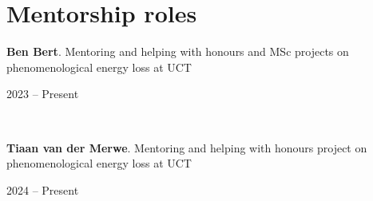 \documentclass[11pt,letter,sans]{moderncv}
\begin{document}
\section{Mentorship roles}
\begin{minipage}[t]{0.8\textwidth}
	\textbf{Ben Bert}. Mentoring and helping with honours and MSc projects on phenomenological energy loss at UCT
\end{minipage}\hfill
\begin{minipage}[t]{0.2\textwidth}
  \hfill 2023 -- Present 
\end{minipage}\\
\begin{minipage}[t]{0.8\textwidth}
	\textbf{Tiaan van der Merwe}. Mentoring and helping with honours project on phenomenological energy loss at UCT
\end{minipage}\hfill
\begin{minipage}[t]{0.2\textwidth}
  \hfill 2024 -- Present 
\end{minipage}\\
\end{document}
